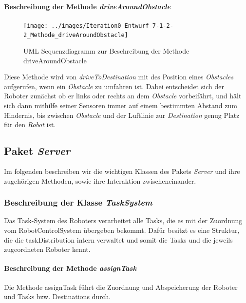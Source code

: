 			\paragraph{Beschreibung der Methode \textit{driveAroundObstacle}}
			\begin{figure}[H]
			\centering
			\texttt{[image: ../images/Iteration0\_Entwurf\_7-1-2-2\_Methode\_driveAroundObstacle]}
			\caption{UML Sequenzdiagramm zur Beschreibung der Methode driveAroundObstacle}
			\label{BeschreibungKlasse1}
			\end{figure}

			Diese Methode wird von \textit{driveToDestination} mit des Position eines \textit{Obstacles} aufgerufen, 
			wenn ein \textit{Obstacle} zu umfahren ist.
			Dabei entscheidet sich der Roboter zunächst ob er links oder rechts an dem \textit{Obstacle} vorbeifährt, 
			und hält sich dann mithilfe seiner Sensoren immer auf einem bestimmten Abstand zum Hindernis, bis zwischen 
			\textit{Obstacle} und der Luftlinie zur \textit{Destination} genug Platz für den \textit{Robot} ist.
	
\subsection{Paket \textit{Server}}
	Im folgenden beschreiben wir die wichtigen Klassen des Pakets \textit{Server} 
	und ihre zugehörigen Methoden, sowie ihre Interaktion zwischeneinander. 


	\subsubsection{Beschreibung der Klasse \textit{TaskSystem}}
		Das Task-System des Roboters verarbeitet alle Tasks, die es mit der Zuordnung vom RobotControlSystem übergeben bekommt. Dafür besitzt es eine Struktur, die die taskDistribution intern verwaltet und somit die Tasks und die jeweils zugeordneten Roboter kennt.
		
			\paragraph{Beschreibung der Methode \textit{assignTask}}
			Die Methode assignTask führt die Zuordnung und Abspeicherung der Roboter und Tasks bzw. Destinations durch.
			

